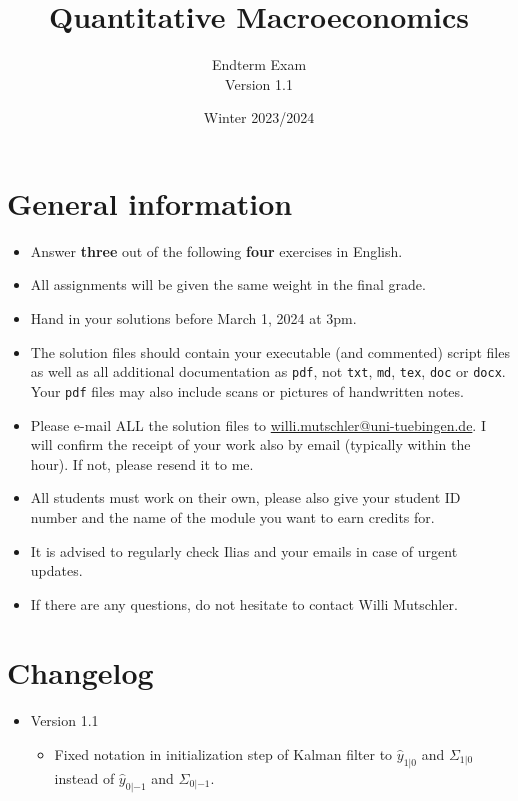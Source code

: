 \documentclass{article}
\begin{document}
	
\title{Quantitative Macroeconomics}
\author{Endterm Exam\\Version 1.1}
\date{Winter 2023/2024}


\maketitle

\section*{General information}
\begin{itemize}
	\item Answer \textbf{three} out of the following \textbf{four} exercises in English.
	\item All assignments will be given the same weight in the final grade.
	\item Hand in your solutions before March 1, 2024 at 3pm.
	\item The solution files should contain your executable (and commented) script files
		as well as all additional documentation as \texttt{pdf}, not \texttt{txt}, \texttt{md}, \texttt{tex}, \texttt{doc} or \texttt{docx}.
	Your \texttt{pdf} files may also include scans or pictures of handwritten notes.
	\item Please e-mail ALL the solution files to \url{willi.mutschler@uni-tuebingen.de}.
	I will confirm the receipt of your work also by email (typically within the hour). If not, please resend it to me.
	\item All students must work on their own, please also give your student ID number and the name of the module you want to earn credits for.
	\item It is advised to regularly check Ilias and your emails in case of urgent updates.
	\item If there are any questions, do not hesitate to contact Willi Mutschler.
\end{itemize}

\section*{Changelog}

\begin{itemize}
	\item Version 1.1
	\begin{itemize}
		\item Fixed notation in initialization step of Kalman filter to $\hat{y}_{1|0}$ and $\Sigma_{1|0}$ instead of $\hat{y}_{0|-1}$ and $\Sigma_{0|-1}$.
	\end{itemize}
\end{itemize}
\end{document}
